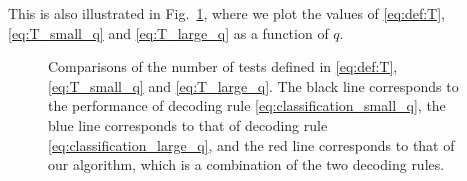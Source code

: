\documentclass[onecolumn,letterpaper]{IEEEtran}
\newcommand{\cp}{{q}}
\newcommand{\nt}{{m}}
\newcommand{\mo}{{s}}
\newcommand{\pmin}{{P_{\min}(\cp)}}
\newcommand{\pgapm}{{\nabla(\cp)}}
\newcommand{\ftau}{{\Gamma}}
\newcommand{\fT}{{\ftau(\cp)}}
\newcommand{\fTo}{\ftau_1(\cp)}
\newcommand{\fTt}{\ftau_2(\cp)}
\begin{document}
This is also illustrated in Fig.~\ref{fig:T}, where we plot the values of \eqref{eq:def:T}, \eqref{eq:T_small_q} and \eqref{eq:T_large_q} as a function of $\cp$.
\begin{figure}
\centering
\caption{Comparisons of the number of tests defined in \eqref{eq:def:T}, \eqref{eq:T_small_q} and \eqref{eq:T_large_q}. The black line corresponds to the performance of decoding rule \eqref{eq:classification_small_q}, the blue line corresponds to that of decoding rule \eqref{eq:classification_large_q}, and the red line corresponds to that of our algorithm, which is a combination of the two decoding rules.}
\label{fig:T}
\end{figure}
\end{document}
